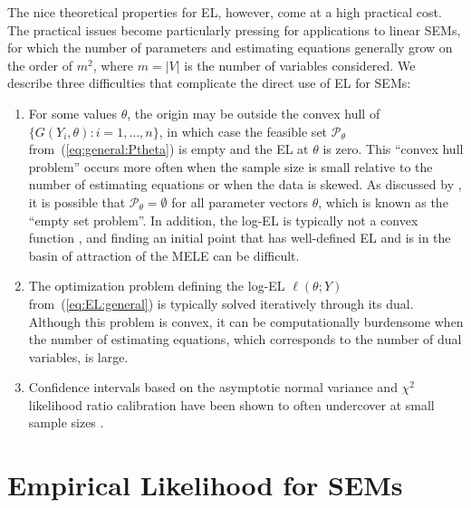 \documentclass[notitlepage]{article}
\begin{document}
The nice theoretical properties for EL, however, come at a high
practical cost.  The practical issues become particularly pressing for
applications to linear SEMs, for which the number of parameters and
estimating equations generally grow on the order of $m^2$, where
$m=|V|$ is the number of variables considered.  We describe
three difficulties that complicate the direct use of EL for
SEMs:
\begin{enumerate}[label=(\roman*)]
\item For some values $\theta$, the origin may be outside the convex
  hull of $\{G(Y_i, \theta):i=1,\dots,n\}$, in which case the feasible
  set $\mathcal{P}_\theta$ from~(\ref{eq:general:Ptheta}) is empty and
  the EL at $\theta$ is zero.  This ``convex hull problem''
  occurs more often when the sample size is small relative to the
  number of estimating equations or when the data is skewed. As
  discussed by \citet{grendar2009empty}, it is possible that
  $\mathcal{P}_\theta=\emptyset$ for all parameter vectors $\theta$,
  which is known as the ``empty set problem''.
  In addition, the log-EL is typically not a convex function
  \citep{chaudhuri2016constrained}, and finding an initial
  point that has well-defined EL and is in the basin of attraction of
  the MELE can be difficult.

\item The optimization problem defining the log-EL $\ell(\theta;Y)$
  from~(\ref{eq:EL:general}) is typically solved iteratively through
  its dual.  Although this problem is convex, it can be
  computationally burdensome when the number of estimating equations,
  which corresponds to the number of dual variables, is large.

\item Confidence intervals based on the asymptotic normal variance and
  $\chi^2$ likelihood ratio calibration have been shown to often
  undercover at small sample sizes \citep{tsao2014extended}.
\end{enumerate}



\section{Empirical Likelihood for
  SEMs} \label{sec:elwithSecondMoments}
\end{document}
